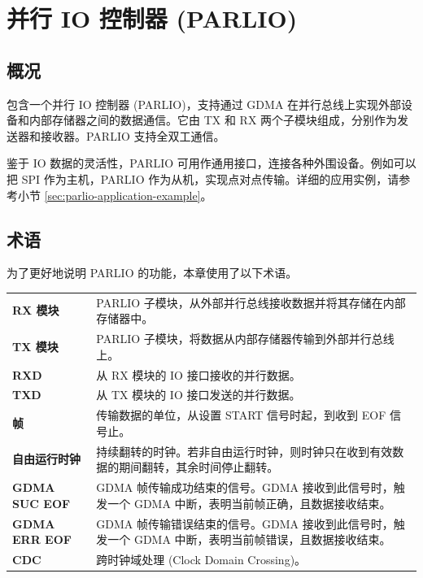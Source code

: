 \documentclass[main\_\_CN.tex]{subfiles}
\begin{document}

\ifglobal
\else
    {\let\clearpage\relax \listoftodos}
    {\let\clearpage\relax \listofdonetodos}
    \tableofcontents
\fi



\hypertarget{parlio}{}
\chapter{并行 IO 控制器 (PARLIO)}
\label{mod:parlio}




\section{概况}

\chipname{} 包含一个并行 IO 控制器 (PARLIO)，支持通过 GDMA 在并行总线上实现外部设备和内部存储器之间的数据通信。它由 TX 和 RX 两个子模块组成，分别作为发送器和接收器。PARLIO 支持全双工通信。

鉴于 IO 数据的灵活性，PARLIO 可用作通用接口，连接各种外围设备。例如可以把 SPI 作为主机，PARLIO 作为从机，实现点对点传输。详细的应用实例，请参考小节 \ref{sec:parlio-application-example}。

\section{术语}
为了更好地说明 PARLIO 的功能，本章使用了以下术语。

\begin{longtable}[c]{ R{4cm} p{10cm} }

\textbf{RX 模块}      & PARLIO 子模块，从外部并行总线接收数据并将其存储在内部存储器中。 \\
\textbf{TX 模块}      & PARLIO 子模块，将数据从内部存储器传输到外部并行总线上。 \\
\textbf{RXD}          & 从 RX 模块的 IO 接口接收的并行数据。 \\
\textbf{TXD}          & 从 TX 模块的 IO 接口发送的并行数据。  \\
\textbf{帧}           & 传输数据的单位，从设置 START 信号时起，到收到 EOF 信号止。 \\
\textbf{自由运行时钟} & 持续翻转的时钟。若非自由运行时钟，则时钟只在收到有效数据的期间翻转，其余时间停止翻转。\\
\textbf{GDMA SUC EOF} & GDMA 帧传输成功结束的信号。GDMA 接收到此信号时，触发一个 GDMA 中断，表明当前帧正确，且数据接收结束。 \\
\textbf{GDMA ERR EOF} & GDMA 帧传输错误结束的信号。GDMA 接收到此信号时，触发一个 GDMA 中断，表明当前帧错误，且数据接收结束。 \\
\textbf{CDC}          & 跨时钟域处理 (Clock Domain Crossing)。 \\

\end{longtable}
\end{document}
